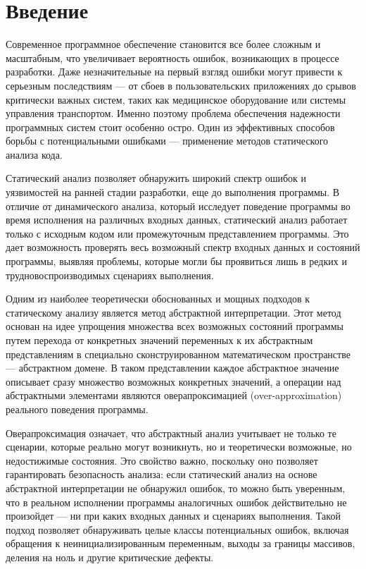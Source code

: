 \section{Введение}
Современное программное обеспечение становится все более сложным и масштабным, что увеличивает вероятность ошибок, возникающих в процессе разработки. Даже незначительные на первый взгляд ошибки могут привести к серьезным последствиям — от сбоев в пользовательских приложениях до срывов критически важных систем, таких как медицинское оборудование или системы управления транспортом. Именно поэтому проблема обеспечения надежности программных систем стоит особенно остро. Один из эффективных способов борьбы с потенциальными ошибками — применение методов статического анализа кода.

Статический анализ позволяет обнаружить широкий спектр ошибок и уязвимостей на ранней стадии разработки, еще до выполнения программы. В отличие от динамического анализа, который исследует поведение программы во время исполнения на различных входных данных, статический анализ работает только с исходным кодом или промежуточным представлением программы. Это дает возможность проверять весь возможный спектр входных данных и состояний программы, выявляя проблемы, которые могли бы проявиться лишь в редких и трудновоспроизводимых сценариях выполнения.

Одним из наиболее теоретически обоснованных и мощных подходов к статическому анализу является метод абстрактной интерпретации. Этот метод основан на идее упрощения множества всех возможных состояний программы путем перехода от конкретных значений переменных к их абстрактным представлениям в специально сконструированном математическом пространстве — абстрактном домене. В таком представлении каждое абстрактное значение описывает сразу множество возможных конкретных значений, а операции над абстрактными элементами являются оверапроксимацией (over-approximation) реального поведения программы.

Оверапроксимация означает, что абстрактный анализ учитывает не только те сценарии, которые реально могут возникнуть, но и теоретически возможные, но недостижимые состояния. Это свойство важно, поскольку оно позволяет гарантировать безопасность анализа: если статический анализ на основе абстрактной интерпретации не обнаружил ошибок, то можно быть уверенным, что в реальном исполнении программы аналогичных ошибок действительно не произойдет — ни при каких входных данных и сценариях выполнения. Такой подход позволяет обнаруживать целые классы потенциальных ошибок, включая обращения к неинициализированным переменным, выходы за границы массивов, деления на ноль и другие критические дефекты.

